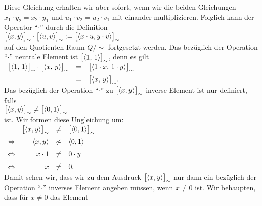 Diese Gleichung erhalten wir aber sofort, wenn wir die beiden Gleichungen
$x_1 \cdot y_2 = x_2 \cdot y_1$ und $u_1 \cdot v_2 = u_2 \cdot v_1$ mit einander multiplizieren.
Folglich kann der Operator ``$\cdot$'' durch die Definition
\\[0.2cm]
\hspace*{1.3cm}
$\bigl[\pair(x,y)\bigr]_\sim \cdot \bigl[\pair(u,v)\bigr]_\sim := 
 \bigl[\pair(x \cdot u, y \cdot v)\bigr]_\sim
$
\\[0.2cm]
auf den Quotienten-Raum $Q/\!\sim$ fortgesetzt werden.
Das bezüglich der Operation ``$\cdot$'' neutrale Element ist $\bigl[\pair(1,\,1)\bigr]_\sim$, denn es gilt
\\[0.2cm]
\hspace*{1.3cm}
$
\begin{array}[t]{lcl}
      \bigl[\pair(1,\,1)\bigr]_\sim \cdot  \bigl[\pair(x,\,y)\bigr]_\sim
& = & \bigl[\pair(1 \cdot x,\,1 \cdot y)\bigr]_\sim                      \\[0.2cm]
& = & \bigl[\pair(x,\,y)\bigr]_\sim.
\end{array}
$
\\[0.2cm]
Das bezüglich der Operation ``$\cdot$'' zu $\bigl[\pair(x,y)\bigr]_\sim$ inverse Element ist nur definiert,
falls
\\[0.2cm]
\hspace*{1.3cm}
 $\bigl[\pair(x,y)\bigr]_\sim \not= \bigl[\pair(0,1)\bigr]_\sim$ 
\\[0.2cm]
ist.  Wir formen diese Ungleichung um:
\\[0.2cm]
\hspace*{1.3cm}
$
\begin{array}[t]{lrcl}
                & \bigl[\pair(x,y)\bigr]_\sim & \not= & \bigl[\pair(0,1)\bigr]_\sim  \\[0.2cm]
\Leftrightarrow & \pair(x,y) & \not\sim & \pair(0,1)                                 \\[0.2cm]
\Leftrightarrow & x \cdot 1  & \not=    & 0 \cdot y                                  \\[0.2cm]
\Leftrightarrow & x          & \not=    & 0. 
\end{array}
$
\\[0.2cm]
Damit sehen wir, dass wir zu dem Ausdruck $\bigl[\pair(x,y)\bigr]_\sim$ nur dann ein bezüglich der Operation
``$\cdot$'' inverses Element angeben müssen, wenn $x \not= 0$ ist.  Wir behaupten, dass für $x \not= 0$
das Element
\\[0.2cm]
\hspace*{1.3cm}
